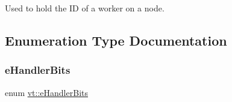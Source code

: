 Used to hold the ID of a worker on a node. 



\subsection{Enumeration Type Documentation}
\mbox{\label{namespacevt_af182285b57b225b163d5d8aff03cb8c2}} 
\subsubsection{\texorpdfstring{e\+Handler\+Bits}{eHandlerBits}}
{\footnotesize\ttfamily enum \hyperlink{namespacevt_af182285b57b225b163d5d8aff03cb8c2}{vt\+::e\+Handler\+Bits}}

